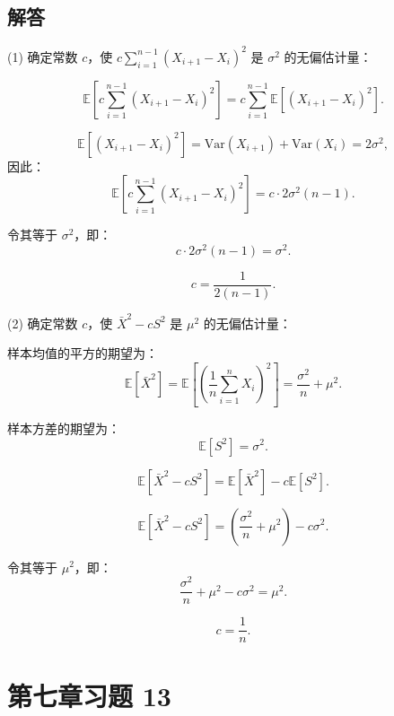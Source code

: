 \documentclass[twoside]{article}
\begin{document}
\begin{ans}{10}{10}
    \section*{解答}

(1) 确定常数 \( c \)，使 \( c \sum_{i=1}^{n-1}(X_{i+1} - X_i)^2 \) 是 \(\sigma^2\) 的无偏估计量：

\[
\mathbb{E} \left[ c \sum_{i=1}^{n-1} (X_{i+1} - X_i)^2 \right] = c \sum_{i=1}^{n-1} \mathbb{E}[(X_{i+1} - X_i)^2].
\]

\[
\mathbb{E}[(X_{i+1} - X_i)^2] = \text{Var}(X_{i+1}) + \text{Var}(X_i) = 2\sigma^2,
\]
因此：
\[
\mathbb{E} \left[ c \sum_{i=1}^{n-1} (X_{i+1} - X_i)^2 \right] = c \cdot 2\sigma^2 (n-1).
\]

令其等于 \(\sigma^2\)，即：
\[
c \cdot 2\sigma^2 (n-1) = \sigma^2.
\]

\[
c = \frac{1}{2(n-1)}.
\]

(2) 确定常数 \( c \)，使 \( \bar{X}^2 - cS^2 \) 是 \(\mu^2\) 的无偏估计量：

样本均值的平方的期望为：
\[
\mathbb{E}[\bar{X}^2] = \mathbb{E}\left[\left(\frac{1}{n} \sum_{i=1}^n X_i\right)^2\right] = \frac{\sigma^2}{n} + \mu^2.
\]

样本方差的期望为：
\[
\mathbb{E}[S^2] = \sigma^2.
\]

\[
\mathbb{E}[\bar{X}^2 - cS^2] = \mathbb{E}[\bar{X}^2] - c\mathbb{E}[S^2].
\]

\[
\mathbb{E}[\bar{X}^2 - cS^2] = \left(\frac{\sigma^2}{n} + \mu^2\right) - c\sigma^2.
\]

令其等于 \(\mu^2\)，即：
\[
\frac{\sigma^2}{n} + \mu^2 - c\sigma^2 = \mu^2.
\]

\[
c = \frac{1}{n}.
\]

\end{ans}

\section{第七章习题 13}
\end{document}
